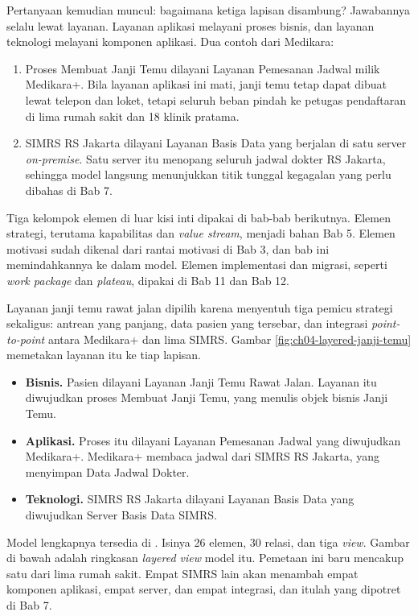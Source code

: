 Pertanyaan kemudian muncul: bagaimana ketiga lapisan disambung? Jawabannya
selalu lewat layanan. Layanan aplikasi melayani proses bisnis, dan layanan
teknologi melayani komponen aplikasi. Dua contoh dari Medikara:

\begin{enumerate}
  \item Proses Membuat Janji Temu dilayani Layanan Pemesanan Jadwal milik
        Medikara+. Bila layanan aplikasi ini mati, janji temu tetap dapat
        dibuat lewat telepon dan loket, tetapi seluruh beban pindah ke
        petugas pendaftaran di lima rumah sakit dan 18 klinik pratama.
  \item SIMRS RS Jakarta dilayani Layanan Basis Data yang berjalan di satu
        server \textit{on-premise}. Satu server itu
        menopang seluruh jadwal dokter RS Jakarta, sehingga model langsung
        menunjukkan titik tunggal kegagalan yang perlu dibahas di Bab 7.
\end{enumerate}

Tiga kelompok elemen di luar kisi inti dipakai di bab-bab berikutnya. Elemen
strategi, terutama kapabilitas dan \textit{value stream}, menjadi bahan Bab 5.
Elemen motivasi sudah dikenal dari rantai motivasi di Bab 3, dan bab ini
memindahkannya ke dalam model. Elemen implementasi dan migrasi, seperti
\textit{work package} dan \textit{plateau}, dipakai di Bab 11 dan Bab 12.

\begin{kasus}[title={Kasus Medikara Health: Layanan Janji Temu dari Pasien sampai Server}]
  Layanan janji temu rawat jalan dipilih karena menyentuh tiga pemicu
  strategi sekaligus: antrean yang panjang, data pasien yang tersebar, dan
  integrasi \textit{point-to-point} antara Medikara+ dan lima SIMRS.
  Gambar \ref{fig:ch04-layered-janji-temu} memetakan layanan itu ke tiap
  lapisan.

  \begin{itemize}
    \item \textbf{Bisnis.} Pasien dilayani Layanan Janji Temu Rawat Jalan.
          Layanan itu diwujudkan proses Membuat Janji Temu, yang menulis
          objek bisnis Janji Temu.
    \item \textbf{Aplikasi.} Proses itu dilayani Layanan Pemesanan Jadwal
          yang diwujudkan Medikara+. Medikara+ membaca jadwal dari SIMRS RS
          Jakarta, yang menyimpan Data Jadwal Dokter.
    \item \textbf{Teknologi.} SIMRS RS Jakarta dilayani Layanan Basis Data
          yang diwujudkan Server Basis Data SIMRS.
  \end{itemize}

  Model lengkapnya tersedia di
  . Isinya 26
  elemen, 30 relasi, dan tiga \textit{view}. Gambar di bawah adalah
  ringkasan \textit{layered view} model itu. Pemetaan ini baru mencakup satu
  dari lima rumah sakit. Empat SIMRS lain akan menambah empat komponen
  aplikasi, empat server, dan empat integrasi, dan itulah yang
  dipotret di Bab 7.
\end{kasus}

